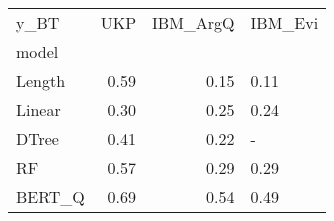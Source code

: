 \begin{tabular}{lrrl}
\toprule
y\_BT &   UKP &  IBM\_ArgQ & IBM\_Evi \\
model  &       &           &         \\
\midrule
Length &  0.59 &      0.15 &    0.11 \\
Linear &  0.30 &      0.25 &    0.24 \\
DTree  &  0.41 &      0.22 &       - \\
RF     &  0.57 &      0.29 &    0.29 \\
BERT\_Q &  0.69 &      0.54 &    0.49 \\
\bottomrule
\end{tabular}
